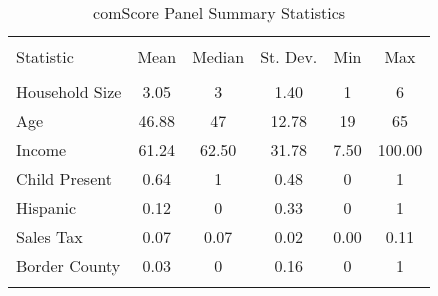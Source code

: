 
\begin{table}[!htbp] \centering 
  \caption{comScore Panel Summary Statistics} 
  \label{tab:comScorePanel} 
\begin{tabular}{@{\extracolsep{5pt}}lccccc} 
\\[-1.8ex]\hline 
\hline \\[-1.8ex] 
Statistic & \multicolumn{1}{c}{Mean} & \multicolumn{1}{c}{Median} & \multicolumn{1}{c}{St. Dev.} & \multicolumn{1}{c}{Min} & \multicolumn{1}{c}{Max} \\ 
\hline \\[-1.8ex] 
Household Size & 3.05 & 3 & 1.40 & 1 & 6 \\ 
Age & 46.88 & 47 & 12.78 & 19 & 65 \\ 
Income & 61.24 & 62.50 & 31.78 & 7.50 & 100.00 \\ 
Child Present & 0.64 & 1 & 0.48 & 0 & 1 \\ 
Hispanic & 0.12 & 0 & 0.33 & 0 & 1 \\ 
Sales Tax & 0.07 & 0.07 & 0.02 & 0.00 & 0.11 \\ 
Border County & 0.03 & 0 & 0.16 & 0 & 1 \\ 
\hline \\[-1.8ex] 
\end{tabular} 
\end{table} 
